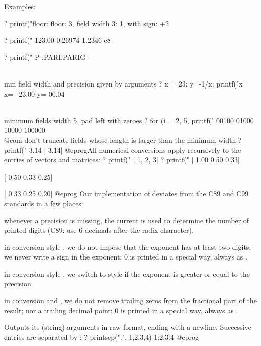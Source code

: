 \noindent Examples:

\bprog
? printf("floor: %
floor: 3, field width 3:   1, with sign:  +2

? printf("%
123.00 0.26974 1.2346 e8

? printf("%
P :PARI:PARIG

\\ min field width and precision given by arguments
? x = 23; y=-1/x; printf("x=%
x=+23.00 y=-00.04

\\ minimum fields width 5, pad left with zeroes
? for (i = 2, 5, printf("%
00100
01000
10000
100000  \\@com don't truncate fields whose length is larger than the minimum width
? printf("%
3.14  |  3.14|
@eprog\noindent All numerical conversions apply recursively to the entries
of vectors and matrices:
\bprog
? printf("%
[   1,   2,   3]
? printf("%
[ 1.00  0.50  0.33]

[ 0.50  0.33  0.25]

[ 0.33  0.25  0.20]
@eprog
 Our implementation of 
deviates from the C89 and C99 standards in a few places:

\item whenever a precision is missing, the current  is
used to determine the number of printed digits (C89: use 6 decimals after
the radix character).

\item in conversion style , we do not impose that the
exponent has at least two digits; we never write a \kbd{+} sign in the
exponent; 0 is printed in a special way, always as .

\item in conversion style , we switch to style  if the
exponent is greater or equal to the precision.

\item in conversion  and , we do not remove trailing zeros
 from the fractional part of the result; nor a trailing decimal point;
 0 is printed in a special way, always as .

\label{se:printsep}
Outputs its (string) arguments in raw format, ending with a newline.
Successive entries are separated by :
\bprog
? printsep(":", 1,2,3,4)
1:2:3:4
@eprog

